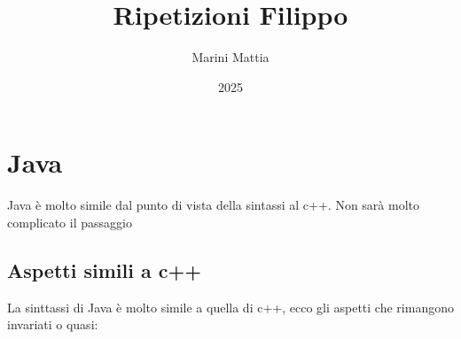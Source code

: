 

\title{Ripetizioni Filippo}
\author{Marini Mattia}
\date{2025}
\lstset{
frame = none
  }


\maketitle
{}
\tableofcontents

\listofexercises

\newpage

\section{Java}
Java è molto simile dal punto di vista della sintassi al c++. Non sarà molto complicato il passaggio
\subsection{Aspetti simili a c++}
La sinttassi di Java è molto simile a quella di c++, ecco gli aspetti che rimangono invariati o quasi:
